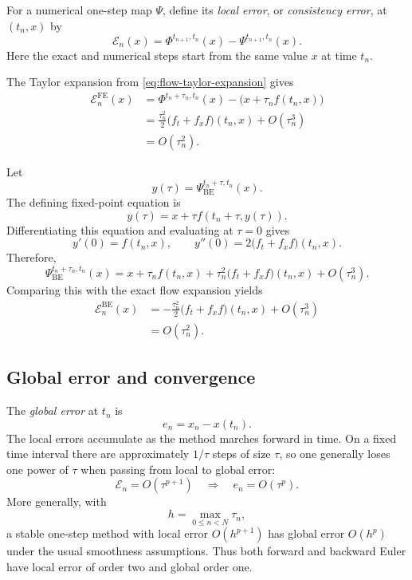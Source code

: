 For a numerical one-step map $\Psi$, define its \emph{local error}, or
\emph{consistency error}, at $(t_n,x)$ by
\begin{equation}\label{eq:local-error-aug-28}
  \mathcal{E}_n(x)
  =\Phi^{t_{n+1},t_n}(x)-\Psi^{t_{n+1},t_n}(x).
\end{equation}
Here the exact and numerical steps start from the same value $x$ at
time $t_n$.

\begin{example}
  The Taylor expansion from \eqref{eq:flow-taylor-expansion} gives
  \begin{align*}
    \mathcal{E}_n^{\mathrm{FE}}(x)
    &=\Phi^{t_n+\tau_n,t_n}(x)
      -\bigl(x+\tau_n f(t_n,x)\bigr)\\
    &=\frac{\tau_n^2}{2}
      \bigl(f_t+f_xf\bigr)(t_n,x)+O(\tau_n^3)\\
    &=O(\tau_n^2).
  \end{align*}
\end{example}

\begin{example}
  Let
  \[
    y(\tau)=\Psi_{\mathrm{BE}}^{t_n+\tau,t_n}(x).
  \]
  The defining fixed-point equation is
  \[
    y(\tau)=x+\tau f(t_n+\tau,y(\tau)).
  \]
  Differentiating this equation and evaluating at $\tau=0$ gives
  \[
    y'(0)=f(t_n,x),
    \qquad
    y''(0)=2\bigl(f_t+f_xf\bigr)(t_n,x).
  \]
  Therefore,
  \[
    \Psi_{\mathrm{BE}}^{t_n+\tau_n,t_n}(x)
    =x+\tau_n f(t_n,x)
     +\tau_n^2\bigl(f_t+f_xf\bigr)(t_n,x)
     +O(\tau_n^3).
  \]
  Comparing this with the exact flow expansion yields
  \begin{align*}
    \mathcal{E}_n^{\mathrm{BE}}(x)
    &=-\frac{\tau_n^2}{2}
      \bigl(f_t+f_xf\bigr)(t_n,x)+O(\tau_n^3)\\
    &=O(\tau_n^2).
  \end{align*}
\end{example}

\subsection{Global error and convergence}

The \emph{global error} at $t_n$ is
\begin{equation}\label{eq:global-error-aug-28}
  e_n=x_n-x(t_n).
\end{equation}
The local errors accumulate as the method marches forward in time. On a
fixed time interval there are approximately $1/\tau$ steps of size
$\tau$, so one generally loses one power of $\tau$ when passing from
local to global error:
\[
  \mathcal{E}_n=O(\tau^{p+1})
  \quad\Longrightarrow\quad
  e_n=O(\tau^p).
\]
More generally, with
\[
  h=\max_{0\leq n<N}\tau_n,
\]
a stable one-step method with local error $O(h^{p+1})$ has global error
$O(h^p)$ under the usual smoothness assumptions. Thus both forward and
backward Euler have local error of order two and global order one.
